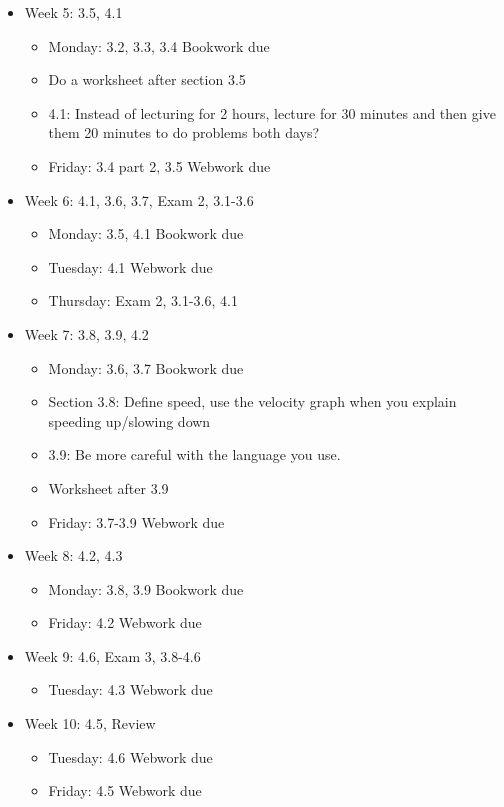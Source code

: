 \documentclass[11pt]{article}
\begin{document}
\begin{itemize}
\begin{itemize}
\end{itemize}
\item Week 5: 3.5, 4.1
\begin{itemize}
\item Monday: 3.2, 3.3, 3.4 Bookwork due
\item Do a worksheet after section 3.5
\item 4.1: Instead of lecturing for 2 hours, lecture for 30 minutes and then give them 20 minutes to do problems both days?
\item Friday: 3.4 part 2, 3.5 Webwork due
\end{itemize}
\item Week 6: 4.1, 3.6, 3.7, Exam 2, 3.1-3.6
\begin{itemize}
\item Monday: 3.5, 4.1 Bookwork due
\item Tuesday: 4.1 Webwork due
\item Thursday: Exam 2, 3.1-3.6, 4.1
\end{itemize}
\item Week 7: 3.8, 3.9, 4.2
\begin{itemize}
\item Monday: 3.6, 3.7 Bookwork due
\item Section 3.8: Define speed, use the velocity graph when you explain speeding up/slowing down
\item 3.9: Be more careful with the language you use. 
\item Worksheet after 3.9
\item Friday: 3.7-3.9 Webwork due
\end{itemize}
\item Week 8:  4.2, 4.3
\begin{itemize}
\item Monday: 3.8, 3.9 Bookwork due
\item Friday: 4.2 Webwork due
\end{itemize}
\item Week 9:  4.6, Exam 3, 3.8-4.6
\begin{itemize}
\item Tuesday: 4.3 Webwork due
\end{itemize}
\item Week 10:  4.5, Review
\begin{itemize}
\item Tuesday: 4.6 Webwork due
\item Friday: 4.5 Webwork due
\end{itemize}
\end{itemize}
\end{document}
